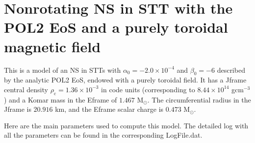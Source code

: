 \documentclass[letterpaper,10pt,english]{sphinxmanual}
\begin{document}
\section{Non\sphinxhyphen{}rotating NS in STT with the POL2 EoS and a purely toroidal magnetic field}
\label{\detokenize{examples_stt:non-rotating-ns-in-stt-with-the-pol2-eos-and-a-purely-toroidal-magnetic-field}}
\sphinxAtStartPar
This is a model of an NS in STTs with \(\alpha _0 = -2.0\times 10^{-4}\) and \(\beta _0 = -6\) described by the analytic POL2 EoS, endowed with a purely toroidal field. It has a J\sphinxhyphen{}frame central density \(\rho _\mathrm{c}=1.36\times 10^{-3}\) in code units (corresponding to \(8.44\times 10^{14}\) gcm\(^{-3}\)) and a Komar mass in the E\sphinxhyphen{}frame of \(1.467\) M\( _\odot\). The circumferential radius in the J\sphinxhyphen{}frame is \(20.916\) km, and the E\sphinxhyphen{}frame scalar charge is \(0.473\) M\( _\odot\).

\sphinxAtStartPar
Here are the main parameters used to compute this model. The detailed log with all the parameters can be found in the corresponding LogFile.dat.

\begin{sphinxVerbatim}[commandchars=\\\{\}]
                    
                 
              
                 
              
\end{sphinxVerbatim}
\end{document}
